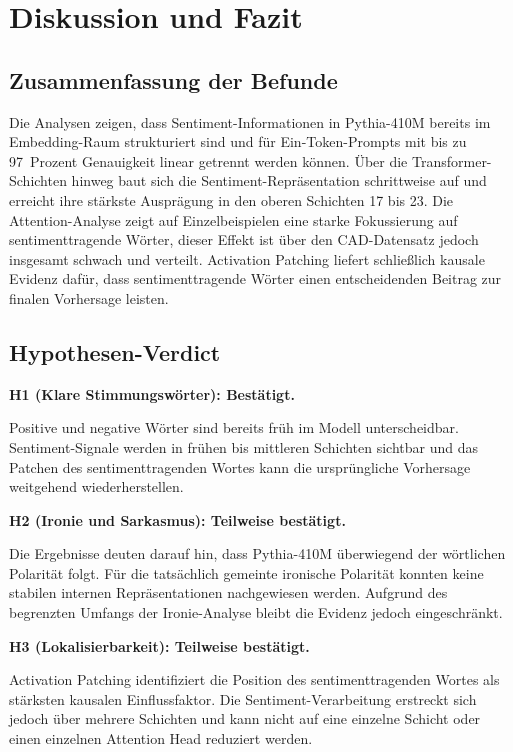\section{Diskussion und Fazit}

\subsection{Zusammenfassung der Befunde}

Die Analysen zeigen, dass Sentiment-Informationen in Pythia-410M bereits im Embedding-Raum strukturiert sind und für Ein-Token-Prompts mit bis zu 97~Prozent Genauigkeit linear getrennt werden können. Über die Transformer-Schichten hinweg baut sich die Sentiment-Repräsentation schrittweise auf und erreicht ihre stärkste Ausprägung in den oberen Schichten 17 bis 23. Die Attention-Analyse zeigt auf Einzelbeispielen eine starke Fokussierung auf sentimenttragende Wörter, dieser Effekt ist über den CAD-Datensatz jedoch insgesamt schwach und verteilt. Activation Patching liefert schließlich kausale Evidenz dafür, dass sentimenttragende Wörter einen entscheidenden Beitrag zur finalen Vorhersage leisten.

\subsection{Hypothesen-Verdict}

\textbf{H1 (Klare Stimmungswörter): Bestätigt.}

Positive und negative Wörter sind bereits früh im Modell unterscheidbar. Sentiment-Signale werden in frühen bis mittleren Schichten sichtbar und das Patchen des sentimenttragenden Wortes kann die ursprüngliche Vorhersage weitgehend wiederherstellen.

\textbf{H2 (Ironie und Sarkasmus): Teilweise bestätigt.}

Die Ergebnisse deuten darauf hin, dass Pythia-410M überwiegend der wörtlichen Polarität folgt. Für die tatsächlich gemeinte ironische Polarität konnten keine stabilen internen Repräsentationen nachgewiesen werden. Aufgrund des begrenzten Umfangs der Ironie-Analyse bleibt die Evidenz jedoch eingeschränkt.

\textbf{H3 (Lokalisierbarkeit): Teilweise bestätigt.}

Activation Patching identifiziert die Position des sentimenttragenden Wortes als stärksten kausalen Einflussfaktor. Die Sentiment-Verarbeitung erstreckt sich jedoch über mehrere Schichten und kann nicht auf eine einzelne Schicht oder einen einzelnen Attention Head reduziert werden.

